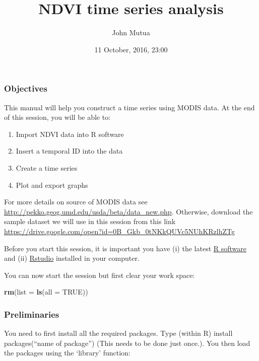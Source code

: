 \documentclass[]{article}
\title{NDVI time series analysis}
\author{John Mutua}
\date{11 October, 2016, 23:00}
\newenvironment{Shaded}{\begin{snugshade}}{\end{snugshade}}
\newcommand{\KeywordTok}[1]{\textcolor[rgb]{0.13,0.29,0.53}{\textbf{{#1}}}}
\newcommand{\DataTypeTok}[1]{\textcolor[rgb]{0.13,0.29,0.53}{{#1}}}
\newcommand{\OtherTok}[1]{\textcolor[rgb]{0.56,0.35,0.01}{{#1}}}
\newcommand{\NormalTok}[1]{{#1}}
\begin{document}
\maketitle


\subsubsection{Objectives}\label{objectives}

This manual will help you construct a time series using MODIS data. At
the end of this session, you will be able to:

\begin{enumerate}
\def\labelenumi{\arabic{enumi}.}
\itemsep1pt\parskip0pt
\item
  Import NDVI data into R software
\item
  Insert a temporal ID into the data
\item
  Create a time series
\item
  Plot and export graphs
\end{enumerate}

For more details on source of MODIS data see
\url{http://pekko.geog.umd.edu/usda/beta/data_new.php}. Otherwise,
download the sample dataset we will use in this session from this link
\url{https://drive.google.com/open?id=0B_Gkb_0tNKkQUVc5NUhKRzlhZTg}

Before you start this session, it is important you have (i) the latest
\href{https://cran.r-project.org/bin/windows/base/}{R software} and (ii)
\href{https://www.rstudio.com/}{Rstudio} installed in your computer.

You can now start the session but first clear your work space:

\begin{Shaded}
\begin{Highlighting}[]
\KeywordTok{rm}\NormalTok{(}\DataTypeTok{list =} \KeywordTok{ls}\NormalTok{(}\DataTypeTok{all =} \OtherTok{TRUE}\NormalTok{))}
\end{Highlighting}
\end{Shaded}

\subsubsection{Preliminaries}\label{preliminaries}

You need to first install all the required packages. Type (within R)
install packages(``name of package'') (This needs to be done just
once.). You then load the packages using the `library' function:
\end{document}
